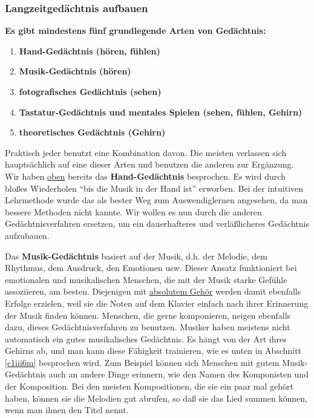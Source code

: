 
\subsubsection{Langzeitgedächtnis aufbauen}
\label{c1iii6j} 

\textbf{Es gibt mindestens fünf grundlegende Arten von Gedächtnis:}

\begin{enumerate}[label={\arabic*.}] 
\item \textbf{Hand-Gedächtnis (hören, fühlen)}
\item \textbf{Musik-Gedächtnis (hören)}
\item \textbf{fotografisches Gedächtnis (sehen)}
\item \textbf{Tastatur-Gedächtnis und mentales Spielen (sehen, fühlen, Gehirn)}
\item \textbf{theoretisches Gedächtnis (Gehirn)}
 \end{enumerate}
Praktisch jeder benutzt eine Kombination davon.
Die meisten verlassen sich hauptsächlich auf eine dieser Arten und benutzen die anderen zur Ergänzung.
\label{c1iii6hand}
Wir haben \hyperref[c1iii6d]{oben} bereits das \textbf{Hand-Gedächtnis} besprochen.
Es wird durch bloßes Wiederholen \enquote{bis die Musik in der Hand ist} erworben.
Bei der intuitiven Lehrmethode wurde das als bester Weg zum Auswendiglernen angesehen, da man bessere Methoden nicht kannte.
Wir wollen es nun durch die anderen Gedächtnisverfahren ersetzen, um ein dauerhafteres und verläßlicheres Gedächtnis aufzubauen.


\label{c1iii6musik}

Das \textbf{Musik-Gedächtnis} basiert auf der Musik, d.h. der Melodie, dem Rhythmus, dem Ausdruck, den Emotionen usw.
Dieser Ansatz funktioniert bei emotionalen und musikalischen Menschen, die mit der Musik starke Gefühle assoziieren, am besten.
Diejenigen mit \hyperref[c1iii12]{absolutem Gehör} werden damit ebenfalls Erfolge erzielen, weil sie die Noten auf dem Klavier einfach nach ihrer Erinnerung der Musik finden können.
Menschen, die gerne komponieren, neigen ebenfalls dazu, dieses Gedächtnisverfahren zu benutzen.
Musiker haben meistens nicht automatisch ein gutes musikalisches Gedächtnis.
Es hängt von der Art ihres Gehirns ab, und man kann diese Fähigkeit trainieren, wie es unten in Abschnitt \hyperref[c1iii6m]{\autoref{c1iii6m}} besprochen wird.
Zum Beispiel können sich Menschen mit gutem Musik-Gedächtnis auch an andere Dinge erinnern, wie den Namen des Komponisten und der Komposition.
Bei den meisten Kompositionen, die sie ein paar mal gehört haben, können sie die Melodien gut abrufen, so daß sie das Lied summen können, wenn man ihnen den Titel nennt.


